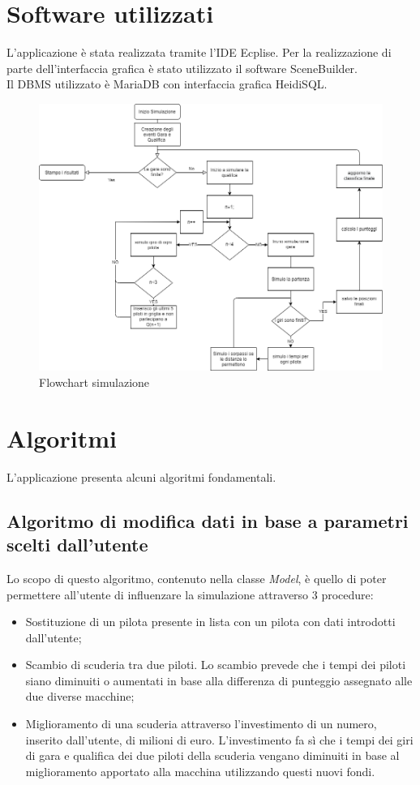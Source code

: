 \section[Software utilizzati]{Software utilizzati} %
L'applicazione è stata realizzata tramite l'IDE Ecplise. Per la realizzazione di parte dell'interfaccia grafica è stato utilizzato il software SceneBuilder.\\
Il DBMS utilizzato è MariaDB con interfaccia grafica HeidiSQL.
\begin{figure}[h]
\centering
\includegraphics[width=1\linewidth]{images/Flowchart simulazione.png}
\caption{Flowchart simulazione}
\label{fig:Flowchart simulazione}
\end{figure}

\section[Algoritmi]{Algoritmi} %
L'applicazione presenta alcuni algoritmi fondamentali.
\subsection{Algoritmo di modifica dati in base a parametri scelti dall'utente}
Lo scopo di questo algoritmo, contenuto nella classe \textit{Model}, è quello di poter permettere all'utente di influenzare la simulazione attraverso 3 procedure: 
\begin{itemize}
\item Sostituzione di un pilota presente in lista con un pilota con dati introdotti dall'utente;
\item Scambio di scuderia tra due piloti. Lo scambio prevede che i tempi dei piloti siano diminuiti o aumentati in base alla differenza di punteggio assegnato alle due diverse macchine;
\item Miglioramento di una scuderia attraverso l'investimento di un numero, inserito dall'utente, di milioni di euro. L'investimento fa sì che i tempi dei giri di gara e qualifica dei due piloti della scuderia vengano diminuiti in base al miglioramento apportato alla macchina utilizzando questi nuovi fondi.
\end{itemize}
